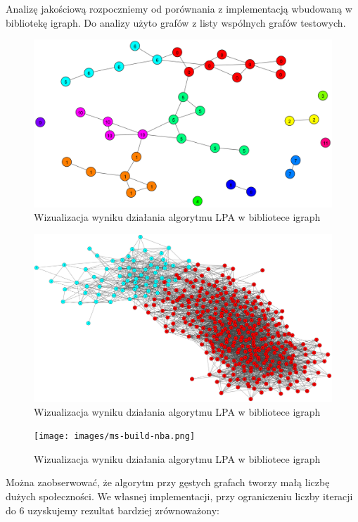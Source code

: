 \documentclass{article}
\begin{document}
Analizę jakościową rozpoczniemy od porównania z implementacją wbudowaną w bibliotekę igraph. Do analizy użyto grafów z listy wspólnych grafów testowych.

\begin{figure}[H]
\centering
\includegraphics[width=\textwidth]{images/ms-build-lpa-0.png}
\caption{Wizualizacja wyniku działania algorytmu LPA w bibliotece igraph}
\end{figure}

\begin{figure}[H]
\centering
\includegraphics[width=\textwidth]{images/ms-build-lpa-2.png}
\caption{Wizualizacja wyniku działania algorytmu LPA w bibliotece igraph}
\end{figure}

\begin{figure}[H]
\centering
\texttt{[image: images/ms-build-nba.png]}
\caption{Wizualizacja wyniku działania algorytmu LPA w bibliotece igraph}
\end{figure}

Można zaobserwować, że algorytm przy gęstych grafach tworzy małą liczbę dużych społeczności. We własnej implementacji, przy ograniczeniu liczby iteracji do 6 uzyskujemy rezultat bardziej zrównoważony:
\end{document}
